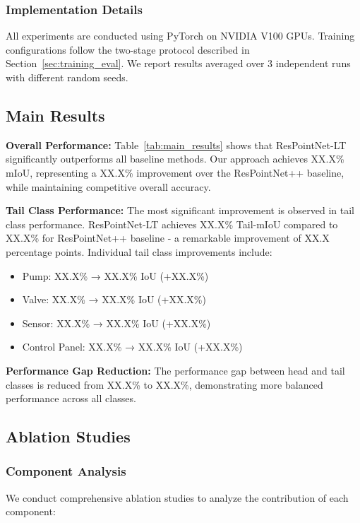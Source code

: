 \documentclass[preprint,12pt]{elsarticle}
\begin{document}
\subsubsection{Implementation Details}
All experiments are conducted using PyTorch on NVIDIA V100 GPUs. Training configurations follow the two-stage protocol described in Section~\ref{sec:training_eval}. We report results averaged over 3 independent runs with different random seeds.

\subsection{Main Results}
\label{sec:main_results}

\textbf{Overall Performance:} Table~\ref{tab:main_results} shows that ResPointNet-LT significantly outperforms all baseline methods. Our approach achieves XX.X\% mIoU, representing a XX.X\% improvement over the ResPointNet++ baseline, while maintaining competitive overall accuracy.

\textbf{Tail Class Performance:} The most significant improvement is observed in tail class performance. ResPointNet-LT achieves XX.X\% Tail-mIoU compared to XX.X\% for ResPointNet++ baseline - a remarkable improvement of XX.X percentage points. Individual tail class improvements include:
\begin{itemize}
    \item Pump: XX.X\% → XX.X\% IoU (+XX.X\%)
    \item Valve: XX.X\% → XX.X\% IoU (+XX.X\%)  
    \item Sensor: XX.X\% → XX.X\% IoU (+XX.X\%)
    \item Control Panel: XX.X\% → XX.X\% IoU (+XX.X\%)
\end{itemize}

\textbf{Performance Gap Reduction:} The performance gap between head and tail classes is reduced from XX.X\% to XX.X\%, demonstrating more balanced performance across all classes.

\subsection{Ablation Studies}
\label{sec:ablation_studies}

\subsubsection{Component Analysis}
We conduct comprehensive ablation studies to analyze the contribution of each component:
\end{document}
